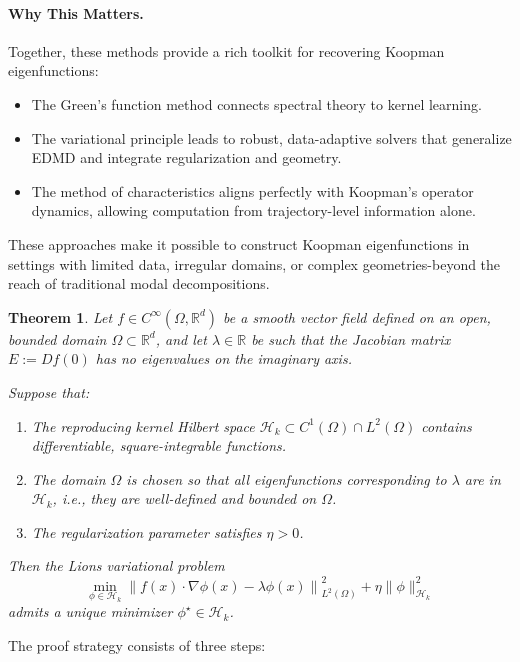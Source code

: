 \documentclass[11pt]{article}
\theoremstyle{plain}
\newtheorem{theorem}{Theorem}[section]
\def\[{\begin{equation}}
\def\]{\end{equation}}
\begin{document}
\paragraph{Why This Matters.}
Together, these methods provide a rich toolkit for recovering Koopman eigenfunctions:
\begin{itemize}
    \item The Green’s function method connects spectral theory to kernel learning.
    \item The variational principle leads to robust, data-adaptive solvers that generalize EDMD and integrate regularization and geometry.
    \item The method of characteristics aligns perfectly with Koopman's operator dynamics, allowing computation from trajectory-level information alone.
\end{itemize}
These approaches make it possible to construct Koopman eigenfunctions in settings with limited data, irregular domains, or complex geometries-beyond the reach of traditional modal decompositions.


\begin{theorem} Let \( f \in C^\infty(\Omega, \mathbb{R}^d) \) be a smooth vector field defined on an open, bounded domain \( \Omega \subset \mathbb{R}^d \), and let \( \lambda \in \mathbb{R} \) be such that the Jacobian matrix \( E := Df(0) \) has no eigenvalues on the imaginary axis.

Suppose that:
\begin{enumerate}
    \item The reproducing kernel Hilbert space \( \mathcal{H}_k \subset C^1(\Omega) \cap L^2(\Omega) \) contains differentiable, square-integrable functions.
    \item The domain \( \Omega \) is chosen so that all eigenfunctions corresponding to \( \lambda \) are in \( \mathcal{H}_k \), i.e., they are well-defined and bounded on \( \Omega \).
    \item The regularization parameter satisfies \( \eta > 0 \).
\end{enumerate}
Then the Lions variational problem
\[
\min_{\phi \in \mathcal{H}_k} \left\| f(x) \cdot \nabla \phi(x) - \lambda \phi(x) \right\|_{L^2(\Omega)}^2 + \eta \| \phi \|_{\mathcal{H}_k}^2
\]
admits a unique minimizer \( \phi^\star \in \mathcal{H}_k \).
\end{theorem}




The proof strategy consists of three steps: 
\end{document}
